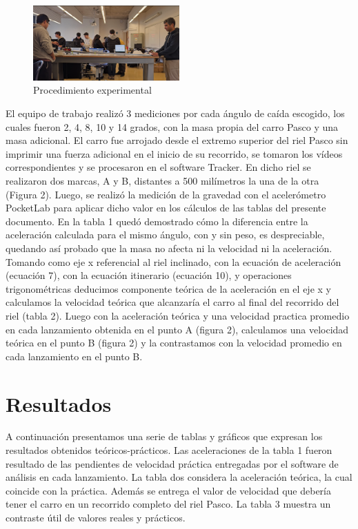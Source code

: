 \documentclass[twocolumn,12pt]{article}
\begin{document}
	\begin{figure}[h]
	\centering
	\includegraphics[width=0.5\textwidth]{./Multimedia/fotografia_laboratorio.png}
	\caption{ Procedimiento experimental}
	\label{Imagen:mi_imagen}
	\end{figure}

        El equipo de trabajo realizó 3 mediciones por cada ángulo de caída escogido, los cuales fueron 2, 4, 8, 10 y 14 grados, con la masa propia del carro Pasco y una masa adicional. El carro fue arrojado desde el extremo superior del riel Pasco sin imprimir una fuerza adicional en el inicio de su recorrido, se tomaron los vídeos correspondientes y se procesaron en el software Tracker. En dicho riel se realizaron dos marcas, A y B, distantes a 500 milímetros la una de la otra (Figura 2). Luego, se realizó la medición de la gravedad con el acelerómetro PocketLab para aplicar dicho valor en los cálculos de las tablas del presente documento. En la tabla 1 quedó demostrado cómo la diferencia entre la aceleración calculada para el mismo ángulo, con y sin peso, es despreciable, quedando así probado que la masa no afecta ni la velocidad ni la aceleración. Tomando como eje x referencial al riel inclinado, con la ecuación de aceleración (ecuación 7), con la ecuación itinerario (ecuación 10), y operaciones trigonométricas deducimos componente teórica de la aceleración en el eje x y calculamos la velocidad teórica que alcanzaría el carro al final del recorrido del riel (tabla 2). Luego con la aceleración teórica y una velocidad practica promedio en cada lanzamiento obtenida en el punto A (figura 2), calculamos una velocidad teórica en el punto B (figura 2) y la contrastamos con la velocidad promedio en cada lanzamiento en el punto B.  
	
	\section{Resultados}
	A continuación presentamos una serie de tablas y gráficos que expresan los resultados obtenidos teóricos-prácticos. Las aceleraciones de la tabla 1 fueron resultado de las pendientes de velocidad práctica entregadas por el software de análisis en cada lanzamiento. La tabla dos considera la aceleración teórica, la cual coincide con la práctica. Además se entrega el valor de velocidad que debería tener el carro en un recorrido completo del riel Pasco. La tabla 3 muestra un contraste útil de valores reales y prácticos.
	
\end{document}

